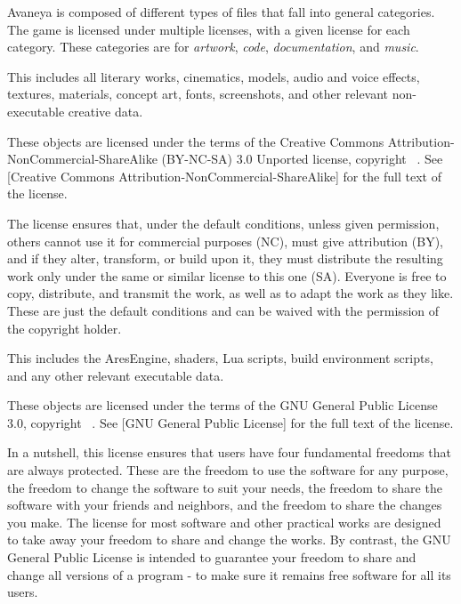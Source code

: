 

Avaneya is composed of different types of files that fall into general categories. The game is licensed under multiple licenses, with a given license for each category. These categories are for {\it artwork}, {\it code}, {\it documentation}, and {\it music}.

\startitemize[3]
\setupwhitespace[big]

This includes all literary works, cinematics, models, audio and voice effects, textures, materials, concept art, fonts, screenshots, and other relevant non-executable creative data. 

These objects are licensed under the terms of the Creative Commons Attribution-NonCommercial-ShareAlike (BY-NC-SA) 3.0 Unported license, copyright \CopyrightDates\ \CopyrightHolder. See [Creative Commons Attribution-NonCommercial-ShareAlike] for the full text of the license.

The license ensures that, under the default conditions, unless given permission, others cannot use it for commercial purposes (NC), must give attribution (BY), and if they alter, transform, or build upon it, they must distribute the resulting work only under the same or similar license to this one (SA). Everyone is free to copy, distribute, and transmit the work, as well as to adapt the work as they like. These are just the default conditions and can be waived with the permission of the copyright holder.


This includes the AresEngine, shaders, Lua scripts, build environment scripts, and any other relevant executable data.

These objects are licensed under the terms of the GNU General Public License 3.0, copyright \CopyrightDates\ \CopyrightHolder. See [GNU General Public License] for the full text of the license.

In a nutshell, this license ensures that users have four fundamental freedoms that are always protected. These are the freedom to use the software for any purpose, the freedom to change the software to suit your needs, the freedom to share the software with your friends and neighbors, and the freedom to share the changes you make. The license for most software and other practical works are designed to take away your freedom to share and change the works. By contrast, the GNU General Public License is intended to guarantee your freedom to share and change all versions of a program - to make sure it remains free software for all its users.


